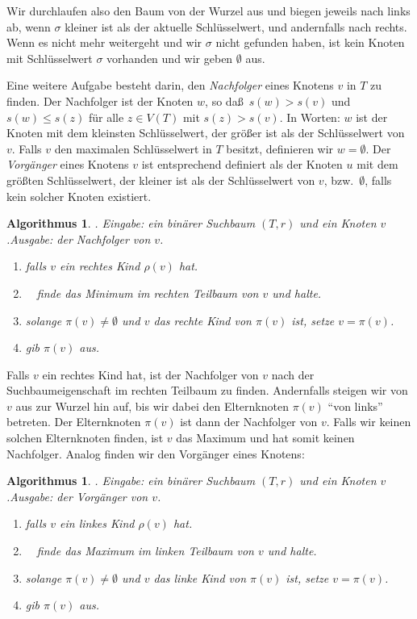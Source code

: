 \documentclass[10pt,reqno]{amsart}
\numberwithin{equation}{section}
\newtheorem{algorithm}[definition]{Algorithmus}
\begin{document}
Wir durchlaufen also den Baum von der Wurzel aus und biegen jeweils nach links ab, wenn $\sigma$ kleiner ist als der aktuelle Schl\"usselwert, und andernfalls nach rechts.
Wenn es nicht mehr weitergeht und wir $\sigma$ nicht gefunden haben, ist kein Knoten mit Schl\"usselwert $\sigma$ vorhanden und wir geben $\emptyset$ aus.

Eine weitere Aufgabe besteht darin, den \emph{Nachfolger} eines Knotens $v$ in $T$ zu finden.
Der Nachfolger ist der Knoten $w$, so da\ss\  $s(w)>s(v)$ und $s(w)\leq s(z)$ f\"ur alle $z\in V(T)$ mit $s(z)>s(v)$.
In Worten: $w$ ist der Knoten mit dem kleinsten Schl\"usselwert, der gr\"o\ss er ist als der Schl\"usselwert von $v$.
Falls $v$ den maximalen Schl\"usselwert in $T$ besitzt, definieren wir $w=\emptyset$.
Der \emph{Vorg\"anger} eines Knotens $v$ ist entsprechend definiert als der Knoten $u$ mit dem gr\"o\ss ten Schl\"usselwert, der kleiner ist als der Schl\"usselwert von $v$, bzw.\ $\emptyset$, falls kein solcher Knoten existiert.

\begin{algorithm}. {\em Eingabe:} ein bin\"arer Suchbaum $(T,r)$ und ein Knoten $v$.\label{alg_print}
	{\em Ausgabe:} der Nachfolger von $v$.
	\begin{enumerate}
		\item falls $v$ ein rechtes Kind $\rho(v)$ hat.
		\item $\quad$finde das Minimum im rechten Teilbaum von $v$ und halte.
		\item solange $\pi(v)\neq\emptyset$ und $v$ das rechte Kind von $\pi(v)$ ist, setze $v=\pi(v)$.
		\item gib $\pi(v)$ aus.
	\end{enumerate}
\end{algorithm}

Falls $v$ ein rechtes Kind hat, ist der Nachfolger von $v$ nach der Suchbaumeigenschaft im rechten Teilbaum zu finden.
Andernfalls steigen wir von $v$ aus zur Wurzel hin auf, bis wir dabei den Elternknoten $\pi(v)$ ``von links'' betreten.
Der Elternknoten $\pi(v)$ ist dann der Nachfolger von $v$.
Falls wir keinen solchen Elternknoten finden, ist  $v$ das Maximum und hat somit keinen Nachfolger.
Analog finden wir den Vorg\"anger eines Knotens:

\begin{algorithm}. {\em Eingabe:} ein bin\"arer Suchbaum $(T,r)$ und ein Knoten $v$.\label{alg_print}
	{\em Ausgabe:} der Vorg\"anger von $v$.
	\begin{enumerate}
		\item falls $v$ ein linkes Kind $\rho(v)$ hat.
		\item $\quad$finde das Maximum im linken Teilbaum von $v$ und halte.
		\item solange $\pi(v)\neq\emptyset$ und $v$ das linke Kind von $\pi(v)$ ist, setze $v=\pi(v)$.
		\item gib $\pi(v)$ aus.
	\end{enumerate}
\end{algorithm}
\end{document}

